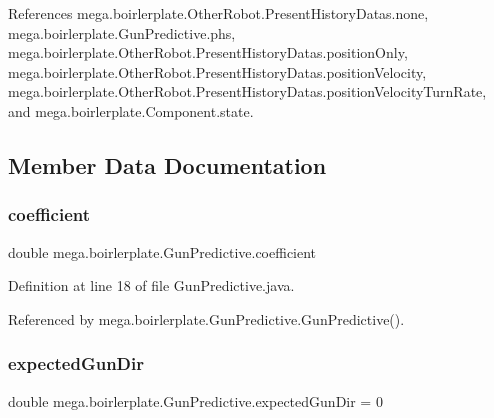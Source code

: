 References mega.\+boirlerplate.\+Other\+Robot.\+Present\+History\+Datas.\+none, mega.\+boirlerplate.\+Gun\+Predictive.\+phs, mega.\+boirlerplate.\+Other\+Robot.\+Present\+History\+Datas.\+position\+Only, mega.\+boirlerplate.\+Other\+Robot.\+Present\+History\+Datas.\+position\+Velocity, mega.\+boirlerplate.\+Other\+Robot.\+Present\+History\+Datas.\+position\+Velocity\+Turn\+Rate, and mega.\+boirlerplate.\+Component.\+state.



\subsection{Member Data Documentation}
\mbox{\label{classmega_1_1boirlerplate_1_1_gun_predictive_adb89d8361c33446c988ec16765cab95f}} 
\subsubsection{\texorpdfstring{coefficient}{coefficient}}
{\footnotesize\ttfamily double mega.\+boirlerplate.\+Gun\+Predictive.\+coefficient\hspace{0.3cm}{\ttfamily [private]}}



Definition at line 18 of file Gun\+Predictive.\+java.



Referenced by mega.\+boirlerplate.\+Gun\+Predictive.\+Gun\+Predictive().

\mbox{\label{classmega_1_1boirlerplate_1_1_gun_predictive_a4a0b2e418a667179cf2c45bbceedc85a}} 
\subsubsection{\texorpdfstring{expected\+Gun\+Dir}{expectedGunDir}}
{\footnotesize\ttfamily double mega.\+boirlerplate.\+Gun\+Predictive.\+expected\+Gun\+Dir = 0\hspace{0.3cm}{\ttfamily [private]}}



